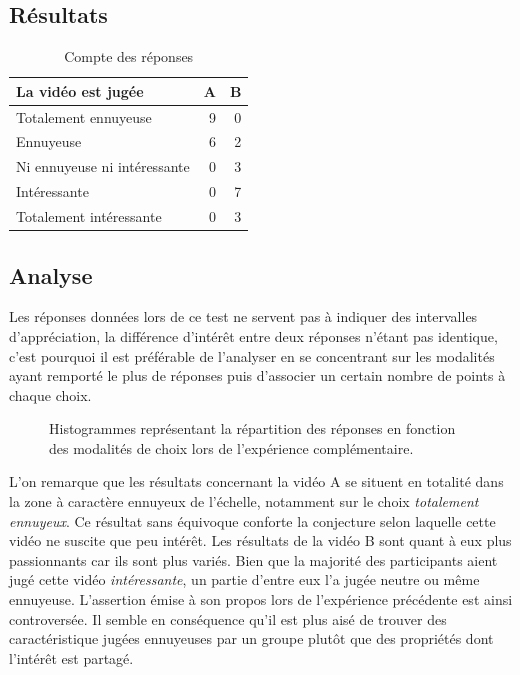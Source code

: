 \documentclass[12pt,fleqn,oneside,french,openany]{book} %
\begin{document}
\subsection{Résultats} \label{ssec:resultats1.2}
\begin{table}[h]
	\centering
	\caption{Compte des réponses} \label{tbl:résultats1.2}
	\begin{tabular}{lrr}
		\toprule
		\textbf{La vidéo est jugée} & \textbf{A} & \textbf{B} \\ \midrule
		Totalement ennuyeuse & 9 & 0 \\ 
		Ennuyeuse & 6 & 2 \\
		Ni ennuyeuse ni intéressante & 0 & 3 \\
		Intéressante & 0 & 7 \\ 
		Totalement intéressante & 0 & 3 \\ \bottomrule
	\end{tabular}
\end{table}

\subsection{Analyse} \label{ssec:analyse1.2}

\begin{remark}
Les réponses données lors de ce test ne servent pas à indiquer des intervalles d'appréciation, la différence d'intérêt entre deux réponses n'étant pas identique, c'est pourquoi il est préférable de l'analyser en se concentrant sur les modalités ayant remporté le plus de réponses puis d'associer un certain nombre de points à chaque choix.
\end{remark}

\begin{figure}[h!]
\centering
\begin{minipage}[t]{.49\textwidth}
\end{minipage}
\hfill
\begin{minipage}[t]{.49\textwidth}
\end{minipage}
\caption{Histogrammes représentant la répartition des réponses en fonction des modalités de choix lors de l'expérience complémentaire.}
\end{figure}

L'on remarque que les résultats concernant la vidéo A se situent en totalité dans la zone à caractère ennuyeux de l'échelle, notamment sur le choix \emph{totalement ennuyeux}. Ce résultat sans équivoque conforte la conjecture selon laquelle cette vidéo ne suscite que peu intérêt. Les résultats de la vidéo B sont quant à eux plus passionnants car ils sont plus variés. Bien que la majorité des participants aient jugé cette vidéo \emph{intéressante}, un partie d'entre eux l'a jugée neutre ou même ennuyeuse. L'assertion émise à son propos lors de l'expérience précédente est ainsi controversée. Il semble en conséquence qu'il est plus aisé de trouver des caractéristique jugées ennuyeuses par un groupe plutôt que des propriétés dont l'intérêt est partagé.
\end{document}
